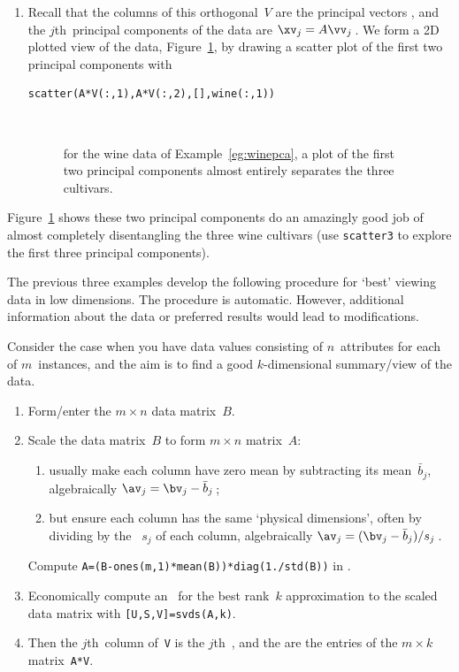 \begin{example}
\begin{solution}
\begin{enumerate}
\item Recall that the columns of this orthogonal~\(V\) are the principal vectors \hlist{}, and the \(j\)th~principal components of the data are \(\xv_j=A\vv_j\)\,.
We form a 2D plotted view of the data, Figure~\ref{fig:winepca}, by drawing a scatter plot of the first two principal components with 
\begin{verbatim}
scatter(A*V(:,1),A*V(:,2),[],wine(:,1))
\end{verbatim}
\begin{figure}
\centering
\\
\caption{for the wine data of Example~\ref{eg:winepca}, a plot of the first two principal components almost entirely separates the three cultivars.}
\label{fig:winepca}
\end{figure}
\end{enumerate}
Figure~\ref{fig:winepca} shows these two principal components do an amazingly good job of almost completely disentangling the three wine cultivars (use \verb|scatter3| to explore the first three principal components).
\end{solution}
\end{example}


The previous three examples develop the following procedure for `best' viewing data in low dimensions.
The procedure is automatic.
However, additional information about the data or preferred results would lead to modifications. 


\begin{procedure} \label{pro:pca}
Consider the case when you have data values consisting of \(n\)~attributes for each of \(m\)~instances, and the aim is to find a good \(k\)-dimensional summary\slash view of the data. 
\begin{enumerate}
\item Form\slash enter the \(m\times n\) data matrix~\(B\).
\item Scale the data matrix~\(B\) to form \(m\times n\) matrix~\(A\):
\begin{enumerate}
\item usually make each column have zero mean by subtracting its mean~\(\bar b_j\), algebraically \(\av_j=\bv_j-\bar b_j\)\,;
\item but ensure each column has the same `physical dimensions', often by dividing by the ~\(s_j\) of each column, algebraically \(\av_j=(\bv_j-\bar b_j)/s_j\)\,.
\end{enumerate}
Compute \verb|A=(B-ones(m,1)*mean(B))*diag(1./std(B))| in \script.
\item  Economically compute an \svd\ for the best rank~\(k\) approximation to the scaled data matrix with \verb|[U,S,V]=svds(A,k)|.
\item Then the \(j\)th~column of~\verb|V| is the \(j\)th~, and the  are the entries of the \(m\times k\) matrix~\verb|A*V|.
\end{enumerate}
\end{procedure}




